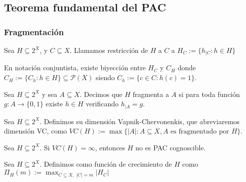 \subsection{Teorema fundamental del PAC}
\begin{frame}\frametitle{Fragmentación}
 \begin{definition}
  Sea $H\subseteq 2^X$, y $C \subseteq X$. Llamamos restricción de $H$ a $C$ a $H_{C} := \{h_{|C} : h\in H\}$

  En notación conjuntista, existe biyección entre $H_C$ y $C_{H}$ donde $C_{H} := \{C_h : h\in H\} \subseteq \mathcal{P}(X)$
  siendo $C_h := \{c\in C: h(c)=1\}$.
 \end{definition}
 
 \begin{definition}
  Sea $H\subseteq 2^X$ y sea $A\subseteq X$. Decimos que $H$ fragmenta a $A$ si para toda función $g:A\rightarrow \{0,1\}$ 
  existe $h\in H$ verificando $h_{|A} = g$.
 \end{definition}
 
 \begin{definition}[Dimensión VC]
  Sea $H \subseteq 2^X$. Definimos su dimensión Vapnik-Chervonenkis, que abreviaremos dimensión VC, como
  $VC(H) := \max \{|A| : A\subseteq X, A \textrm{ es fragmentado por } H\}$.
 \end{definition}
 
 \begin{corollary}
  Sea $H \subseteq 2^X$. Si $VC(H) = \infty$, entonces $H$ no es PAC cognoscible.
 \end{corollary}
 
 \begin{definition}
  Sea $H \subseteq 2^X$. Definimos como función de crecimiento de $H$ como 
  $\Pi_{H}(m) := \max_{C \subseteq X, \,\, |C|=m} |H_C|$
 \end{definition}
\end{frame}

